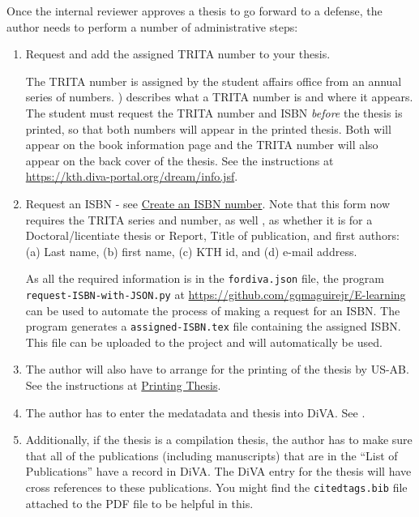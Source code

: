 \documentclass[12pt, twoside]{article}
\newcommand{\fname}[1]{\texttt{#1}}
\begin{document}
Once the internal reviewer approves a thesis to go forward to a defense, the author needs to perform a number of administrative steps:
\begin{enumerate}
    \item Request and add the assigned TRITA number to your thesis.
    
    The TRITA number is assigned by the student affairs office from an annual series of numbers. ) describes what a TRITA number is and where it appears. The student must request the TRITA number and \gls{ISBN} \textit{before} the thesis is printed, so that both numbers will appear in the printed thesis. Both will appear on the book information page and the TRITA number will also appear on the back cover of the thesis. See the instructions at \url{https://kth.diva-portal.org/dream/info.jsf}.

    \item Request an \gls{ISBN} - see \href{https://www.kth.se/en/biblioteket/publicera-analysera/vagledning-for-publicering/bestall-isbn-1.854778}{Create an ISBN number}. 
    Note that this form now requires the TRITA series and number, as well \first, as whether it is for a Doctoral/licentiate thesis or Report, \Second Title of publication, and \third first authors: (a) Last name, (b) first name, (c) KTH id, and (d) e-mail address.
    
    As all the required information is in the \fname{fordiva.json} file, the program \texttt{request-ISBN-with-JSON.py} at \url{https://github.com/gqmaguirejr/E-learning} can be used to automate the process of making a request for an ISBN. The program generates a \fname{assigned-ISBN.tex} file containing the assigned ISBN. This file can be uploaded to the project and will automatically be used.
    
    \item The author will also have to arrange for the printing of the thesis by US-AB. See the instructions at \href{https://www.kth.se/en/student/studier/examensarbete/avhandlingarochexamensarbeten/trycka-avhandlingar-1.900190}{Printing Thesis}.
    
    \item The author has to enter the medatadata and thesis into \gls{DiVA}. See .
    
    \item Additionally, if the thesis is a compilation thesis, the author has to make sure that all of the publications (including manuscripts) that are in the ``List of Publications'' have a record in \gls{DiVA}. The \gls{DiVA} entry for the thesis will have cross references to these publications. You might find the \fname{citedtags.bib} file attached to the PDF file to be helpful in this.
    

\end{enumerate}
\end{document}
